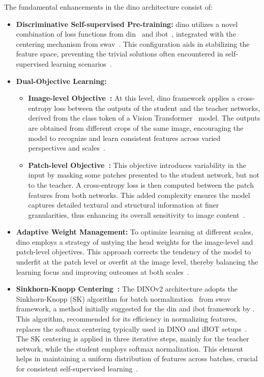 The fundamental enhancements in the \gls{dino} architecture consist of:
\begin{itemize}
    \item \textbf{Discriminative Self-supervised Pre-training:}  \gls{dino} utilizes a novel combination of loss functions from \gls{din}~\cite{dino_caron2021emerging} and \gls{ibot}~\citep{_ibot_image_bert_zhou2021ibot}, integrated with the centering mechanism from \gls{swav}~\citep{_SwAV_caron2020unsupervised}. This configuration aids in stabilizing the feature space, preventing the trivial solutions often encountered in self-supervised learning scenarios~\citep{dinov2_oquab2023dinov2}.
    \item \textbf{Dual-Objective Learning:}
        \begin{itemize}
            \item \textbf{Image-level Objective~\cite{dino_caron2021emerging}:} At this level, \gls{dino} framework applies a cross-entropy loss between the outputs of the student and the teacher networks, derived from the class token of a Vision Transformer~\citep{Vit_Paper_Dosovitskiy2020AnII} model. The outputs are obtained from different crops of the same image, encouraging the model to recognize and learn consistent features across varied perspectives and scales~\citep{dino_caron2021emerging, dinov2_oquab2023dinov2}.
            \item \textbf{Patch-level Objective~\citep{_ibot_image_bert_zhou2021ibot}:} This objective introduces variability in the input by masking some patches presented to the student network, but not to the teacher. A cross-entropy loss is then computed between the patch features from both networks. This added complexity ensures the model captures detailed textural and structural information at finer granularities, thus enhancing its overall sensitivity to image content~\citep{dinov2_oquab2023dinov2}. 
        \end{itemize}
    \item \textbf{Adaptive Weight Management:} To optimize learning at different scales, \gls{dino} employs a strategy of untying the head weights for the image-level and patch-level objectives. This approach corrects the tendency of the model to underfit at the patch level or overfit at the image level, thereby balancing the learning focus and improving outcomes at both scales~\citep{dinov2_oquab2023dinov2}. 
    \item \textbf{Sinkhorn-Knopp Centering~\citep{_SwAV_caron2020unsupervised}:} The DINOv2 architecture adopts the Sinkhorn-Knopp (SK) algorithm for batch normalization~\citep{_SwAV_caron2020unsupervised} from \gls{swav} framework, a method initially suggested for the \gls{din} and \gls{ibot} framework by \citet{ruan2022weighted}. This algorithm, recommended for its efficiency in normalizing features, replaces the softmax centering typically used in DINO and iBOT setups~\citep{ruan2022weighted}. The SK centering is applied in three iterative steps, mainly for the teacher network, while the student employs softmax normalization. This element helps in maintaining a uniform distribution of features across batches, crucial for consistent self-supervised learning~\citep{dinov2_oquab2023dinov2}.

\end{itemize}
